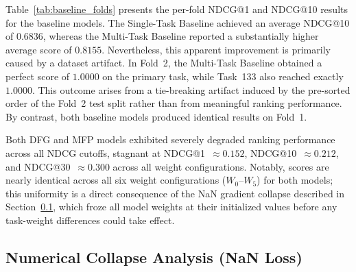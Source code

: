 \begin{table}[!htbp]
  \centering
  \caption{\label{tab:baseline_folds} Per-fold NDCG@1 and NDCG@10 breakdown for baseline models on the primary task (Task~0).}
\end{table}

Table~\ref{tab:baseline_folds} presents the per-fold NDCG@1 and NDCG@10 results for the baseline models. The Single-Task Baseline achieved an average NDCG@10 of $0.6836$, whereas the Multi-Task Baseline reported a substantially higher average score of $0.8155$. Nevertheless, this apparent improvement is primarily caused by a dataset artifact. In Fold~2, the Multi-Task Baseline obtained a perfect score of $1.0000$ on the primary task, while Task~133 also reached exactly $1.0000$. This outcome arises from a tie-breaking artifact induced by the pre-sorted order of the Fold~2 test split rather than from meaningful ranking performance. By contrast, both baseline models produced identical results on Fold~1.

Both DFG and MFP models exhibited severely degraded ranking performance across all NDCG cutoffs, stagnant at NDCG@1~$\approx 0.152$, NDCG@10~$\approx 0.212$, and NDCG@30~$\approx 0.300$ across all weight configurations. Notably, scores are nearly identical across all six weight configurations ($W_0$--$W_5$) for both models; this uniformity is a direct consequence of the NaN gradient collapse described in Section~\ref{sec:nan}, which froze all model weights at their initialized values before any task-weight differences could take effect.

\subsection{Numerical Collapse Analysis (NaN Loss)}
\label{sec:nan}

